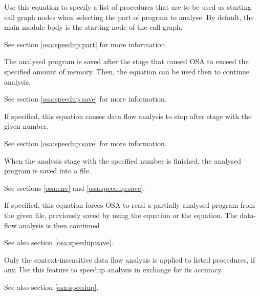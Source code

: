 \ifonline \else
\begin{description}
\fi
{}

        Use this equation to specify a list of procedures that
        are to be used as starting call graph nodes when selecting the part
        of program to analyse. By default, the main module body
        is the starting node of the call graph.

        See section \ref{osa:speedup:part} for more information.


        The analysed program is saved after the stage that caused OSA
        to exceed the specified amount of memory. Then, the
         equation can be used then to continue analysis.

        See section \ref{osa:speedup:save} for more information.


        If specified, this equation causes data flow analysis to stop
        after stage with the given number. \havetowrite

        See section \ref{osa:speedup:save} for more information.


        When the analysis stage with the specified number is finished,
        the analysed program is saved into a file.

        See sections \ref{osa:env} and \ref{osa:speedup:save}. 


        If specified, this equation forces OSA to read a partially
        analysed program from the given file, previously saved by
        using the  equation or the  equation.
        The data-flow analysis is then continued

        See also section \ref{osa:speedup:save}. 


        Only the context-insensitive data flow analysis is applied 
        to listed procedures, if any. Use this feature to speedup
        analysis in exchange for its accuracy.

        See also section \ref{osa:speedup}. 



\end{description}
